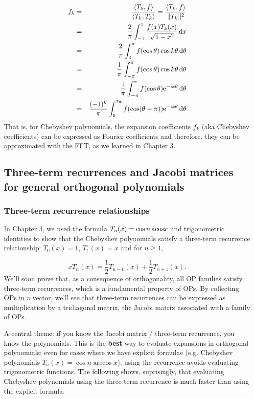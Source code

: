 \documentclass[12pt,a4paper]{article}
\begin{document}
\begin{eqnarray*}
f_k &=&  \frac{\langle T_k,f \rangle}{\langle T_k,T_k \rangle} = \frac{\langle T_k,f \rangle}{\| T_k \|^2} \\
   & = & \frac{2}{\pi}\int_{-1}^{1}   \frac{f(x) T_k(x)}{\sqrt{1 - x^2}}\,{\rm d}x  \\
   & = &  \frac{2}{\pi}\int_{0}^{\pi}   f(\cos \theta) \cos k\theta\,{\rm d}\theta \\
   & = & \frac{1}{\pi}\int_{-\pi}^{\pi}   f(\cos \theta) \cos k\theta\,{\rm d}\theta \\
   & = & \frac{1}{\pi}\int_{-\pi}^{\pi}   f(\cos \theta) {\rm e}^{-{\rm i}k\theta} \,{\rm d}\theta \\
   & = & \frac{(-1)^{k}}{\pi}\int_{0}^{2\pi}   f(\cos (\theta-\pi)) {\rm e}^{-{\rm i}k\theta} \,{\rm d}\theta
\end{eqnarray*}
That is, for Chebyshev polynomials, the expansion coefficients $f_k$ (aka Chebyshev coefficients) can be expressed as Fourier coefficients and therefore, they can be approximated with the FFT, as we learned in Chapter 3.

\subsection{Three-term recurrences and Jacobi matrices for general orthogonal polynomials}
\subsubsection{Three-term recurrence relationships}
In Chapter 3, we used the formula $T_n(x) = \cos n\,{\rm acos}x$ and trigonometric identities to show that the Chebyshev polynomials satisfy a three-term recurrence relationship: $T_0(x) = 1$, $T_1(x)= x$ and for $n \geq 1$,

\[
xT_{n}(x) = \frac{1}{2}T_{n-1}(x) + \frac{1}{2}T_{n+1}(x).
\]
We'll soon prove that, as a consequence of orthogonality, all OP families satisfy three-term recurrences, which is a fundamental property of OPs.  By collecting OPs in a vector, we'll see that three-term recurrences can be expressed as multiplication by a tridiagonal matrix, the Jacobi matrix associated with a family of OPs.   

A central theme: if you know the Jacobi matrix / three-term recurrence, you know the polynomials. This is the \textbf{best} way to evaluate expansions in orthogonal polynomials: even for cases where we have explicit formulae (e.g. Chebyshev polynomials $T_n(x) = \cos n \arccos x$), using the recurrence avoids evaluating trigonometric functions.  The following shows, suprisingly, that evaluating Chebyshev polynomials using the three-term recurrence is much faster than using the explicit formula:
\end{document}
